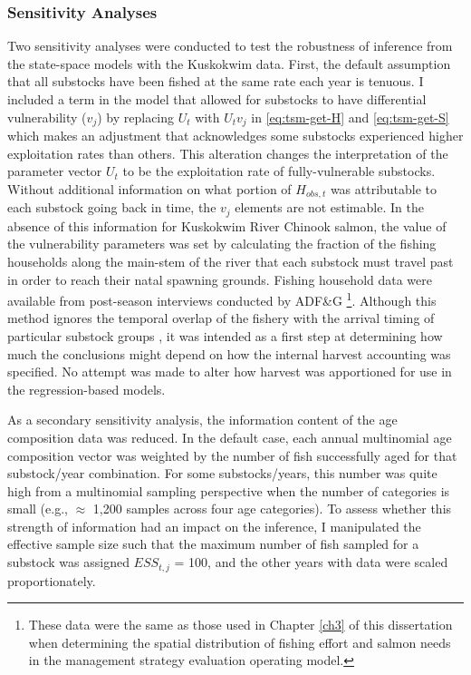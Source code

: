 \documentclass[12pt,]{book}
\let\rmarkdownfootnote\footnote%
\def\footnote{\protect\rmarkdownfootnote}
\theoremstyle{definition}
\theoremstyle{definition}
\theoremstyle{definition}
\theoremstyle{remark}
\begin{document}
\subsubsection{Sensitivity Analyses}\label{sensitivity-analyses}

\noindent
Two sensitivity analyses were conducted to test the robustness of
inference from the state-space models with the Kuskokwim data. First,
the default assumption that all substocks have been fished at the same
rate each year is tenuous. I included a term in the model that allowed
for substocks to have differential vulnerability (\(v_j\)) by replacing
\(U_t\) with \(U_tv_j\) in \eqref{eq:tsm-get-H} and \eqref{eq:tsm-get-S}
which makes an adjustment that acknowledges some substocks experienced
higher exploitation rates than others. This alteration changes the
interpretation of the parameter vector \(U_t\) to be the exploitation
rate of fully-vulnerable substocks. Without additional information on
what portion of \(H_{obs,t}\) was attributable to each substock going
back in time, the \(v_j\) elements are not estimable. In the absence of
this information for Kuskokwim River Chinook salmon, the value of the
vulnerability parameters was set by calculating the fraction of the
fishing households along the main-stem of the river that each substock
must travel past in order to reach their natal spawning grounds. Fishing
household data were available from post-season interviews conducted by
ADF\&G \citep[e.g.,][]{hamazaki-2011, shelden-etal-2016b}\footnote{These
  data were the same as those used in Chapter \ref{ch3} of this
  dissertation when determining the spatial distribution of fishing
  effort and salmon needs in the management strategy evaluation
  operating model.}. Although this method ignores the temporal overlap
of the fishery \citep{hamazaki-2008} with the arrival timing of
particular substock groups
\citep{smith-liller-2017a, smith-liller-2017b}, it was intended as a
first step at determining how much the conclusions might depend on how
the internal harvest accounting was specified. No attempt was made to
alter how harvest was apportioned for use in the regression-based
models.

As a secondary sensitivity analysis, the information content of the age
composition data was reduced. In the default case, each annual
multinomial age composition vector was weighted by the number of fish
successfully aged for that substock/year combination. For some
substocks/years, this number was quite high from a multinomial sampling
perspective when the number of categories is small (e.g., \(\approx\)
1,200 samples across four age categories). To assess whether this
strength of information had an impact on the inference, I manipulated
the effective sample size such that the maximum number of fish sampled
for a substock was assigned \(ESS_{t,j}\) = 100, and the other years
with data were scaled proportionately.
\end{document}
